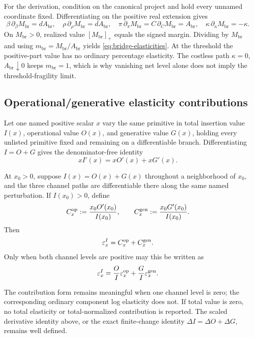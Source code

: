 For the derivation, condition on the canonical project and hold every unnamed
coordinate fixed.  Differentiating on the positive real extension gives
\[
 \beta\,\partial_\beta M_{\mathrm{br}}=dA_{\mathrm{br}},
 \quad
 \rho\,\partial_\rho M_{\mathrm{br}}=dA_{\mathrm{br}},
 \quad
 \pi\,\partial_\pi M_{\mathrm{br}}
 =C\,\partial_C M_{\mathrm{br}}=A_{\mathrm{br}},
 \quad
 \kappa\,\partial_\kappa M_{\mathrm{br}}=-\kappa.
\]
On \(M_{\mathrm{br}}>0\), realized value
\([M_{\mathrm{br}}]_+\) equals the signed margin.  Dividing by
\(M_{\mathrm{br}}\) and using
\(m_{\mathrm{br}}=M_{\mathrm{br}}/A_{\mathrm{br}}\) yields
\eqref{eq:bridge-elasticities}.  At the threshold the positive-part value has
no ordinary percentage elasticity.  The costless path
\(\kappa=0\), \(A_{\mathrm{br}}\downarrow0\) keeps
\(m_{\mathrm{br}}=1\), which is why vanishing net level alone does not imply
the threshold-fragility limit.

\subsection{Operational/generative elasticity contributions}
\label{subsec:elasticity-duration}

Let one named positive scalar \(x\) vary the same primitive in total insertion
value \(I(x)\), operational value \(O(x)\), and generative value \(G(x)\),
holding every unlisted primitive fixed and remaining on a differentiable
branch.  Differentiating \(I=O+G\) gives the denominator-free identity
\[
 xI'(x)=xO'(x)+xG'(x).
\]

\begin{proposition}
\label{prop:channel-elasticity}
At \(x_0>0\), suppose \(I(x)=O(x)+G(x)\) throughout a neighborhood of
\(x_0\), and the three channel paths are differentiable there along the same
named perturbation.  If \(I(x_0)>0\), define
\[
 C_x^{\mathrm{op}}:=\frac{x_0O'(x_0)}{I(x_0)},
 \qquad
 C_x^{\mathrm{gen}}:=\frac{x_0G'(x_0)}{I(x_0)}.
\]
Then
\[
 \varepsilon_x^I=C_x^{\mathrm{op}}+C_x^{\mathrm{gen}}.
\]
Only when both channel levels are positive may this be written as
\[
 \varepsilon_x^I
 =\frac{O}{I}\varepsilon_x^{\mathrm{op}}
  +\frac{G}{I}\varepsilon_x^{\mathrm{gen}}.
\]
\end{proposition}

The contribution form remains meaningful when one channel level is zero;
the corresponding ordinary component log elasticity does not.  If total
value is zero, no total elasticity or total-normalized contribution is
reported.  The scaled derivative identity above, or the exact finite-change
identity \(\Delta I=\Delta O+\Delta G\), remains well defined.

